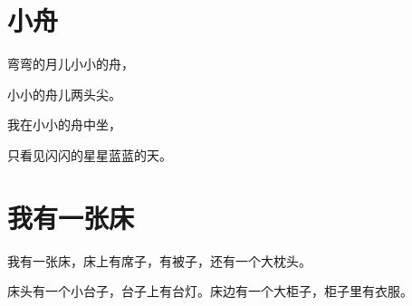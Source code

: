 \documentclass[12pt,UTF-8,openany]{ctexbook}
\begin{document}
\hanzibox{}\hanzibox{}\hanzibox{}\hanzibox{}\hspace{1em}




\chapter{小舟}

\begin{large}
    
    弯弯的月儿小小的舟，
    
    小小的舟儿两头尖。
    
    我在小小的舟中坐，
    
    只看见闪闪的星星蓝蓝的天。
    
\end{large}


\clearpage

\begin{center}
    
\end{center}


\hanzibox{}\hanzibox{}\hanzibox{}\hanzibox{}\hspace{1em}\hanzibox{}\hanzibox{}\hanzibox{}\hanzibox{}

\hanzibox{}\hanzibox{}\hanzibox{}\hanzibox{}\hspace{1em}\hanzibox{}\hanzibox{}\hanzibox{}\hanzibox{}

\hanzibox{}\hanzibox{}\hanzibox{}\hanzibox{}\hspace{1em}\hanzibox{}\hanzibox{}\hanzibox{}\hanzibox{}

\hanzibox{}\hanzibox{}\hanzibox{}\hanzibox{}\hspace{1em}




\chapter{我有一张床}

\begin{large}
    
    我有一张床，床上有席子，有被子，还有一个大枕头。
    
    床头有一个小台子，台子上有台灯。床边有一个大柜子，柜子里有衣服。
    
\end{large}
\end{document}
